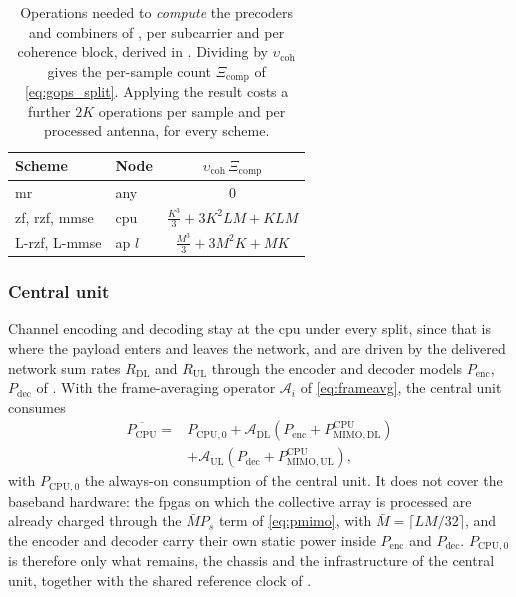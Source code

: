 \begin{table}[t]
\centering
\caption{Operations needed to \emph{compute} the precoders and combiners of
, per subcarrier and per coherence block, derived in
. Dividing by $\upsilon_{\mathrm{coh}}$ gives the
per-sample count $\Xi_{\mathrm{comp}}$ of \eqref{eq:gops_split}. Applying the
result costs a further $2K$ operations per sample and per processed antenna, for
every scheme. }
\label{tab:complexity}
\begin{tabular}{@{}llc@{}}
\toprule
Scheme & Node & $\upsilon_{\mathrm{coh}}\,\Xi_{\mathrm{comp}}$ \\
\midrule
\gls{mr}
  & any & $0$ \\
\gls{zf}, \gls{rzf}, \gls{mmse}
  & \gls{cpu} & $\frac{K^{3}}{3} + 3K^{2}LM + KLM$ \\
L-\gls{rzf}, L-\gls{mmse}
  & \gls{ap} $l$ & $\frac{M^{3}}{3} + 3M^{2}K + MK$ \\
\bottomrule
\end{tabular}
\end{table}

\subsubsection{Central unit}
\label{sssec:cpu}
Channel encoding and decoding stay at the \gls{cpu} under every split, since
that is where the payload enters and leaves the network, and are driven by the
delivered network sum rates $R_{\mathrm{DL}}$ and $R_{\mathrm{UL}}$ through the
encoder and decoder models $P_{\mathrm{enc}}$, $P_{\mathrm{dec}}$ of
\cite{peschiera2026fr3}. With the frame-averaging operator $\mathcal{A}_{i}$ of
\eqref{eq:frameavg}, the central unit consumes
\begin{align}
\label{eq:cpu}
\overline{P_{\mathrm{CPU}}} ={}& P_{\mathrm{CPU},0}
+ \mathcal{A}_{\mathrm{DL}}\!\left(P_{\mathrm{enc}}
+ P_{\mathrm{MIMO,DL}}^{\mathrm{CPU}}\right) \nonumber\\
&+ \mathcal{A}_{\mathrm{UL}}\!\left(P_{\mathrm{dec}}
+ P_{\mathrm{MIMO,UL}}^{\mathrm{CPU}}\right),
\end{align}
with $P_{\mathrm{CPU},0}$ the always-on consumption of the central unit. It does
not cover the baseband hardware: the \glspl{fpga} on which the collective array
is processed are already charged through the $\bar M P_{s}$ term of
\eqref{eq:pmimo}, with $\bar M=\lceil LM/32\rceil$, and the encoder and decoder
carry their own static power inside $P_{\mathrm{enc}}$ and $P_{\mathrm{dec}}$.
$P_{\mathrm{CPU},0}$ is therefore only what remains, the chassis and the
infrastructure of the central unit, together with the shared reference clock of
.

